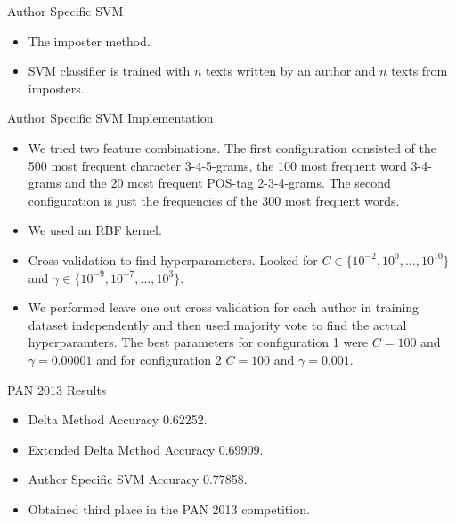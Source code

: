 \documentclass[10pt]{beamer}
\begin{document}
\begin{frame}[fragile]{Author Specific SVM}

    \begin{itemize}
        \item The imposter method.
        \item SVM classifier is trained with $n$ texts written by an author and
            $n$ texts from imposters.
    \end{itemize}

\end{frame}

\begin{frame}[fragile]{Author Specific SVM Implementation}

    \begin{itemize}
        \item We tried two feature combinations. The first configuration
            consisted of the 500 most frequent character 3-4-5-grams, the 100
            most frequent word 3-4-grams and the 20 most frequent POS-tag
            2-3-4-grams. The second configuration is just the frequencies of
            the 300 most frequent words.
        \item We used an RBF kernel.
        \item Cross validation to find hyperparameters. Looked for $C \in
            \{10^{-2}, 10^0, \dots, 10^{10}\}$ and $\gamma \in \{10^{-9},
            10^{-7}, \dots, 10^3\}$.
        \item We performed leave one out cross validation for each author in
            training dataset independently and then used majority vote to find
            the actual hyperparamters. The best parameters for configuration 1
            were $C = 100$ and $\gamma = 0.00001$ and for configuration 2
            $C = 100$ and $\gamma = 0.001$.
    \end{itemize}

\end{frame}

\begin{frame}[fragile]{PAN 2013 Results}

    \begin{itemize}
        \item Delta Method Accuracy 0.62252.
        \item Extended Delta Method Accuracy 0.69909.
        \item Author Specific SVM Accuracy 0.77858.
        \item Obtained third place in the PAN 2013 competition.
    \end{itemize}

\end{frame}
\end{document}

